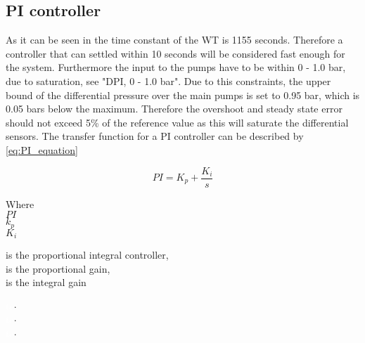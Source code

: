 \vspace{-0.5cm}




\subsection*{PI controller}

As it can be seen in  the time constant of the WT is 1155 seconds. Therefore a controller that can settled within 10 seconds will be considered fast enough for the system.
Furthermore the input to the pumps have to be within 0 - 1.0 bar, due to saturation, see \citep{grunnn_psi_diff} "DPI, 0 - 1.0 bar". Due to this constraints, the upper bound of the differential pressure over the main pumps is set to 0.95 bar, which is 0.05 bars below the maximum. Therefore the overshoot and steady state error should not exceed 5\% of the reference value as this will saturate the differential sensors.
The transfer function for a PI controller can be described by \eqref{eq:PI_equation}

\begin{equation}
	PI = K_p + \frac{K_i}{s}
	\label{eq:PI_equation}
\end{equation}

\begin{minipage}[t]{0.20\textwidth}
Where\\
\hspace*{8mm} $ PI $ \\
\hspace*{8mm} $ k_p $  \\
\hspace*{8mm} $ K_i $  
\end{minipage}
\begin{minipage}[t]{0.68\textwidth}
\vspace*{2mm}
is the proportional integral controller, \\
is the proportional gain, \\
is the integral gain
\end{minipage}
\begin{minipage}[t]{0.10\textwidth}
\vspace*{1.8mm}
\textcolor{White}{te}$\unit{\cdot}$\\
\textcolor{White}{te}$\unit{\cdot}$\\
\textcolor{White}{te}$\unit{\cdot}$
\end{minipage}

